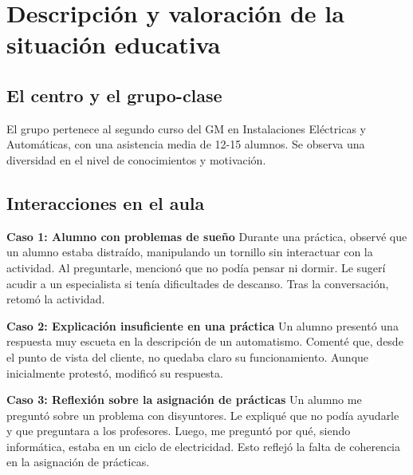 \chapter{Descripción y valoración de la situación educativa}
\section{El centro y el grupo-clase}
El grupo pertenece al segundo curso del GM en Instalaciones Eléctricas y Automáticas, con una asistencia media de 12-15 alumnos. Se observa una diversidad en el nivel de conocimientos y motivación.

\section{Interacciones en el aula}
\textbf{Caso 1: Alumno con problemas de sueño}  
Durante una práctica, observé que un alumno estaba distraído, manipulando un tornillo sin interactuar con la actividad. Al preguntarle, mencionó que no podía pensar ni dormir. Le sugerí acudir a un especialista si tenía dificultades de descanso. Tras la conversación, retomó la actividad.

\textbf{Caso 2: Explicación insuficiente en una práctica}  
Un alumno presentó una respuesta muy escueta en la descripción de un automatismo. Comenté que, desde el punto de vista del cliente, no quedaba claro su funcionamiento. Aunque inicialmente protestó, modificó su respuesta.

\textbf{Caso 3: Reflexión sobre la asignación de prácticas}  
Un alumno me preguntó sobre un problema con disyuntores. Le expliqué que no podía ayudarle y que preguntara a los profesores. Luego, me preguntó por qué, siendo informática, estaba en un ciclo de electricidad. Esto reflejó la falta de coherencia en la asignación de prácticas.
